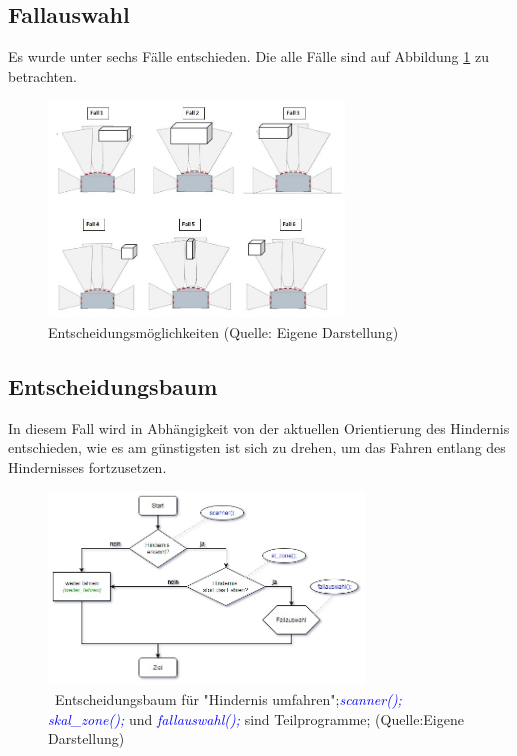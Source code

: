 \subsection{Fallauswahl}

Es wurde unter sechs Fälle entschieden. Die alle Fälle sind auf Abbildung \ref{faelle} zu betrachten.

\begin{figure}[!h]  %
	\centering\includegraphics[width=0.7\textwidth]{images/faelle.jpg}
	\caption{ Entscheidungsmöglichkeiten \newline (Quelle: Eigene Darstellung)}
	\label{faelle} %
\end{figure}

\subsection{Entscheidungsbaum}

 In diesem Fall wird in Abhängigkeit von der aktuellen Orientierung des Hindernis entschieden, wie es am günstigsten ist sich zu drehen, um das Fahren entlang des Hindernisses fortzusetzen. 
 
\begin{figure}[!h] 
	\centering\includegraphics[width=0.75\textwidth]{images/Entsch-baum1.jpg}
	\caption{ \ Entscheidungsbaum für "Hindernis umfahren";\textcolor{blue}{\textit{scanner(); skal\_zone();}} und \textcolor{blue}{\textit {fallauswahl();}} sind Teilprogramme;   (Quelle:Eigene Darstellung)}
	\label{baum1} 
\end{figure}

